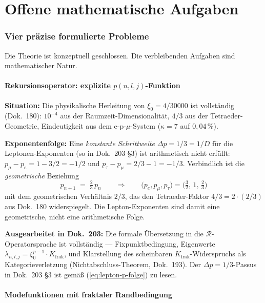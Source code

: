 \part{Offene mathematische Aufgaben}

\section{Vier präzise formulierte Probleme}

Die Theorie ist konzeptuell geschlossen. Die verbleibenden Aufgaben
sind mathematischer Natur.

\subsection{Rekursionsoperator: explizite \texorpdfstring{$p(n,l,j)$}{p(n,l,j)}-Funktion}

\textbf{Situation:} Die physikalische Herleitung von $\xi_0 = 4/30000$
ist vollständig (Dok.~180): $10^{-4}$ aus der Raumzeit-Dimensionalität,
$4/3$ aus der Tetraeder-Geometrie, Eindeutigkeit aus dem e-p-$\mu$-System
($\kappa=7$ auf $0{,}04\,\%$).

\textbf{Exponentenfolge:} Eine \emph{konstante Schrittweite}
$\Delta p = 1/3 = 1/D$ für die Leptonen-Exponenten (so in Dok.~203 §3)
ist arithmetisch nicht erfüllt:
$p_\mu - p_e = 1 - 3/2 = -1/2$ und $p_\tau - p_\mu = 2/3 - 1 = -1/3$.
Verbindlich ist die \emph{geometrische} Beziehung
\begin{equation}
  p_{n+1} \;=\; \tfrac{2}{3}\, p_n
  \qquad
  \Rightarrow \qquad
  \bigl(p_e, p_\mu, p_\tau\bigr) = \bigl(\tfrac{3}{2},\,1,\,\tfrac{2}{3}\bigr)
  \label{eq:lepton-p-folge}
\end{equation}
mit dem geometrischen Verhältnis $2/3$, das den Tetraeder-Faktor
$4/3 = 2 \cdot (2/3)$ aus Dok.~180 widerspiegelt. Die Lepton-Exponenten
sind damit eine geometrische, nicht eine arithmetische Folge.

\textbf{Ausgearbeitet in Dok.~203:} Die formale Übersetzung in die
$\mathcal{R}$-Operatorsprache ist vollständig — Fixpunktbedingung,
Eigenwerte $\lambda_{n,l,j} = \xi_0^{p-1}\cdot K_{\text{frak}}$,
und Klarstellung des scheinbaren $K_{\text{frak}}$-Widerspruchs
als Kategorieverletzung (Nichtabschluss-Theorem, Dok.~193). Der
$\Delta p = 1/3$-Passus in Dok.~203 §3 ist gemäß
(\ref{eq:lepton-p-folge}) zu lesen.

\subsection{Modefunktionen mit fraktaler Randbedingung}

